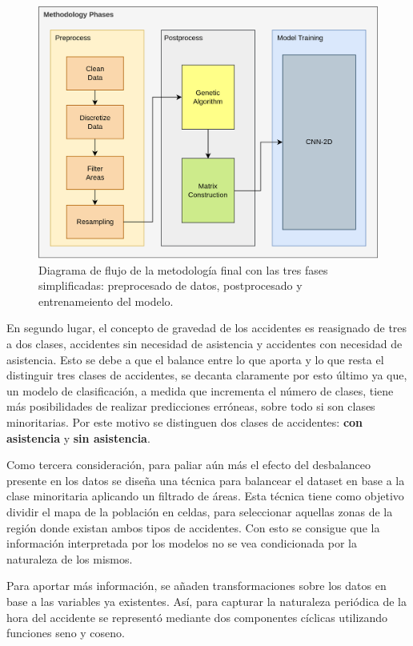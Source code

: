 \documentclass{uathesis-es}
\begin{document}
\begin{figure}[H]
    \centering
    \includegraphics[width=14cm]{Figures/7th DataFlow Chart.png}
    \caption{Diagrama de flujo de la metodología final con las tres fases simplificadas: preprocesado de datos, postprocesado y entrenameiento del modelo.}
    \label{DataFlow}
\end{figure}

En segundo lugar, el concepto de gravedad de los accidentes es reasignado de tres a dos clases, accidentes sin necesidad de asistencia y accidentes con necesidad de asistencia. Esto se debe a que el balance entre lo que aporta  y lo que resta el distinguir tres clases de accidentes, se decanta claramente por esto último ya que, un modelo de clasificación, a medida que incrementa el número de clases, tiene más posibilidades de realizar predicciones erróneas, sobre todo si son clases minoritarias. Por este motivo se distinguen dos clases de accidentes: \textbf{con asistencia} y \textbf{sin asistencia}.

Como tercera consideración, para paliar aún más el efecto del desbalanceo presente en los datos se diseña una técnica para balancear el dataset en base a la clase minoritaria aplicando un filtrado de áreas. Esta técnica tiene como objetivo dividir el mapa de la población en celdas, para seleccionar aquellas zonas de la región donde existan ambos tipos de accidentes. Con esto se consigue que la información interpretada por los modelos no se vea condicionada por la naturaleza de los mismos.

Para aportar más información, se añaden transformaciones sobre los datos en base a las variables ya existentes. Así, para capturar la naturaleza periódica de la hora del accidente se representó mediante dos componentes cíclicas utilizando funciones seno y coseno. 
\end{document}
